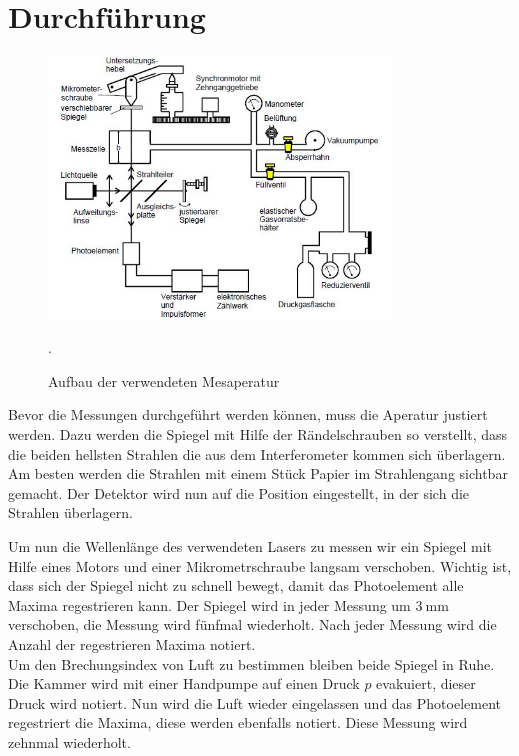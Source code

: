 \section{Durchführung}
\begin{figure}[H]
  \centering
  \includegraphics[height=7cm]{aufbau.JPG}
  \caption{Aufbau der verwendeten Mesaperatur}
  \label{fig:aufbau}
  \cite{skript}.
\end{figure}
Bevor die Messungen durchgeführt werden können, muss die Aperatur justiert werden.
Dazu werden die Spiegel mit Hilfe der Rändelschrauben so verstellt, dass die beiden hellsten
Strahlen die aus dem Interferometer kommen sich überlagern. Am besten werden die Strahlen mit
einem Stück Papier im Strahlengang sichtbar gemacht. Der Detektor wird nun auf die
Position eingestellt, in der sich die Strahlen überlagern.

Um nun die Wellenlänge des verwendeten Lasers zu messen wir ein Spiegel mit Hilfe eines Motors
und einer Mikrometrschraube langsam verschoben. Wichtig ist, dass sich der Spiegel nicht zu schnell
bewegt, damit das Photoelement alle Maxima regestrieren kann. Der Spiegel wird in jeder
Messung um $\SI{3}{\mm}$ verschoben, die Messung wird fünfmal wiederholt. Nach jeder Messung
wird die Anzahl der regestrieren Maxima notiert.\\
Um den Brechungsindex von Luft zu bestimmen bleiben beide Spiegel in Ruhe.
Die Kammer wird mit einer Handpumpe auf einen Druck $p$ evakuiert, dieser Druck wird notiert.
Nun wird die Luft wieder eingelassen und das Photoelement regestriert die Maxima, diese werden
ebenfalls notiert. Diese Messung wird zehnmal wiederholt.



\label{sec:Durchführung}
